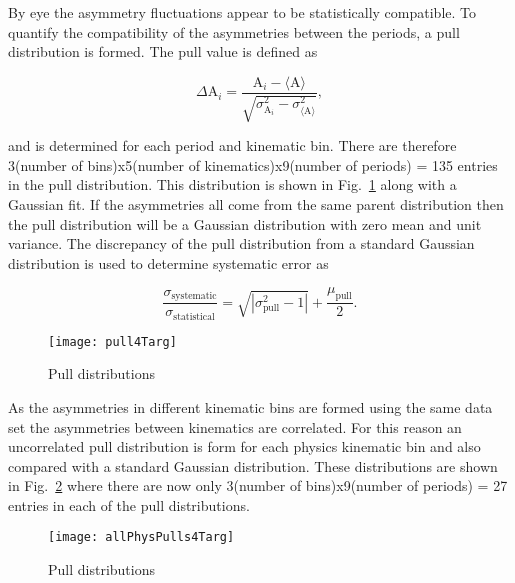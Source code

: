 \noindent
By eye the asymmetry fluctuations appear to be statistically compatible.  To
quantify the compatibility of the asymmetries between the periods, a pull
distribution is formed.  The pull value is defined as

\begin{equation}
  \Delta\mathrm{A}_i =
  \frac{
    \mathrm{A}_i - \langle \mathrm{A} \rangle
  }{
    \sqrt{
      \sigma^2_{\mathrm{A}_i} - \sigma^2_{\langle \mathrm{A} \rangle}
    }
  },
\end{equation}

\noindent
and is determined for each period and kinematic bin.  There are therefore
3(number of bins)x5(number of kinematics)x9(number of periods) = 135 entries in
the pull distribution. This distribution is shown in Fig.~\ref{fig::pull4Targ}
along with a Gaussian fit.  If the asymmetries all come from the same parent
distribution then the pull distribution will be a Gaussian distribution with
zero mean and unit variance.  The discrepancy of the pull distribution from a
standard Gaussian distribution is used to determine systematic error as

\begin{equation}
  \frac{\sigma_{\mathrm{systematic}}}{\sigma_{\mathrm{statistical}}} =
  \sqrt{|\sigma^2_{\mathrm{pull}} - 1|} + \frac{\mu_{\mathrm{pull}}}{2}.
\end{equation}

\begin{figure}[h!t]
  \begin{center}
    \texttt{[image: pull4Targ]}
    \caption{Pull distributions}
    \label{fig::pull4Targ}
  \end{center}
\end{figure}

\noindent
As the asymmetries in different kinematic bins are formed using the same data
set the asymmetries between kinematics are correlated.  For this reason an
uncorrelated pull distribution is form for each physics kinematic bin and also
compared with a standard Gaussian distribution.  These distributions are shown
in Fig.~\ref{fig::allPhysPulls4Targ} where there are now only 3(number of
bins)x9(number of periods) = 27 entries in each of the pull distributions.

\begin{figure}[h!t]
  \begin{center}
    \texttt{[image: allPhysPulls4Targ]}
    \caption{Pull distributions}
    \label{fig::allPhysPulls4Targ}
  \end{center}
\end{figure}


